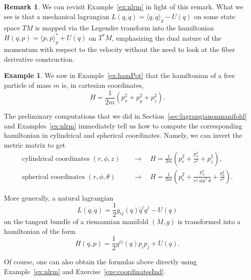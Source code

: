 \documentclass[english,fontsize=11pt,paper=b5]{scrbook}
\numberwithin{equation}{chapter}
\theoremstyle{definition}
\newtheorem{remark}{Remark}[chapter]
\newtheorem{example}{Example}[chapter]
\begin{document}
\begin{remark}
      We can revisit Example~\ref{ex:nlrm} in light of this remark. What we see is that a mechanical lagrangian $L(q,\dot q) = \langle \dot q, \dot q\rangle_g - U(q)$ on some state space $TM$ is mapped via the Legendre transform into the hamiltonian $H(q, p) = \langle p, p \rangle_g^* + U(q)$ on $T^*M$, emphasizing the dual nature of the momentum with respect to the velocity without the need to look at the fiber derivative construction.
    \end{remark}

    \begin{example}
      We saw in Example~\ref{ex:hamPot} that the hamiltonian of a free particle of mass $m$ is, in cartesian coordinates,
      \begin{equation}
        H = \frac{1}{2m}(p_x^2 + p_y^2 + p_z^2).
      \end{equation}

      The preliminary computations that we did in Section~\ref{sec:lagrangianonmanifold} and Examples~\ref{ex:nlrm} immediately tell us how to compute the corresponding hamiltonian in cylindrical and spherical coordinates.
      Namely, we can invert the metric matrix to get
      \begin{align}
        \mbox{cylindrical coordinates } (r,\phi,z) \quad    & \rightarrow\quad H = \frac 1{2m} \left(p_r^2 + \frac{p_\phi^2}{r^2} + p_z^2\right),                               \\
        \mbox{spherical coordinates } (r,\phi,\theta) \quad & \rightarrow\quad H = \frac 1{2m} \left(p_r^2 + \frac{p_\phi^2}{r^2\sin^2\theta} + \frac{p_\theta^2}{r^2} \right).
      \end{align}

      More generally, a natural lagrangian
      \begin{equation}
        L(q,\dot q) = \frac 12 g_{ij}(q) \dot q^i \dot q^j - U(q)
      \end{equation}
      on the tangent bundle of a riemannian manifold $(M,g)$ is transformed into a hamiltonian of the form
      \begin{equation}
        H(q,p) = \frac 12 g^{ij}(q) p_i p_j + U(q).
      \end{equation}

      Of course, one can also obtain the formulas above directly using Example~\ref{ex:nlrm} and Exercise~\ref{exe:coordinatesInd}.
    \end{example}
\end{document}
